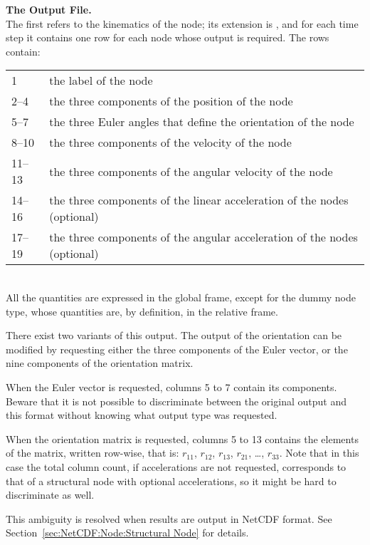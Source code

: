 \textbf{The  Output File.} \\
The first refers to the kinematics of the node; its extension is ,
and for each time step it contains one row for each node whose output is
required.
The rows contain: \vspace{2mm} \\
\begin{tabular}{lp{140mm}}
	\hline
	1      & the label of the node \\
	2--4   & the three components of the position of the node \\
	5--7   & the three Euler angles that define the orientation of the node \\
	8--10  & the three components of the velocity of the node \\
	11--13 & the three components of the angular velocity of the node \\
	\hline
	14--16 & the three components of the linear acceleration
		of the \kw{dynamic} nodes (optional) \\
	17--19 & the three components of the angular acceleration
		of the \kw{dynamic} nodes (optional) \\
	\hline
\end{tabular}\vspace{2mm}\\
All the quantities are expressed in the global frame, except for
the dummy  node type, whose quantities are,
by definition, in the relative frame.

There exist two variants of this output.
The output of the orientation can be modified by requesting
either the three components of the Euler vector,
or the nine components of the orientation matrix.

When the Euler vector is requested, columns 5 to 7 contain
its components.
Beware that it is not possible to discriminate between
the original output and this format without knowing
what output type was requested.

When the orientation matrix is requested, columns 5 to 13
contains the elements of the matrix, written row-wise,
that is: $r_{11}$, $r_{12}$, $r_{13}$, $r_{21}$, \ldots, $r_{33}$.
Note that in this case the total column count, if accelerations
are not requested, corresponds to that of a structural node
with optional accelerations, so it might be hard to discriminate
as well.

This ambiguity is resolved when results are output in NetCDF format.
See Section~\ref{sec:NetCDF:Node:Structural Node} for details.

